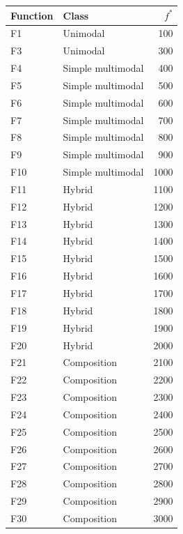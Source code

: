 \zebra
\begin{tabular}{llr}
\toprule
\textbf{Function} & \textbf{Class} & \textbf{$f^{*}$} \\
\midrule
F1 & Unimodal & 100 \\
F3 & Unimodal & 300 \\
F4 & Simple multimodal & 400 \\
F5 & Simple multimodal & 500 \\
F6 & Simple multimodal & 600 \\
F7 & Simple multimodal & 700 \\
F8 & Simple multimodal & 800 \\
F9 & Simple multimodal & 900 \\
F10 & Simple multimodal & 1000 \\
F11 & Hybrid & 1100 \\
F12 & Hybrid & 1200 \\
F13 & Hybrid & 1300 \\
F14 & Hybrid & 1400 \\
F15 & Hybrid & 1500 \\
F16 & Hybrid & 1600 \\
F17 & Hybrid & 1700 \\
F18 & Hybrid & 1800 \\
F19 & Hybrid & 1900 \\
F20 & Hybrid & 2000 \\
F21 & Composition & 2100 \\
F22 & Composition & 2200 \\
F23 & Composition & 2300 \\
F24 & Composition & 2400 \\
F25 & Composition & 2500 \\
F26 & Composition & 2600 \\
F27 & Composition & 2700 \\
F28 & Composition & 2800 \\
F29 & Composition & 2900 \\
F30 & Composition & 3000 \\
\bottomrule
\end{tabular}
